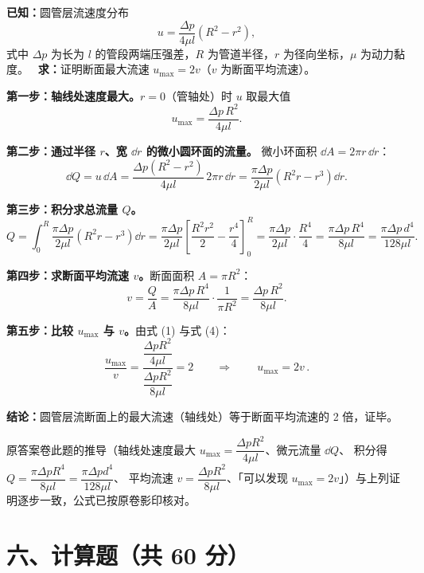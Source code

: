 
\begin{jie}
\textbf{已知：}圆管层流速度分布
\[
u=\frac{\Delta p}{4\mu l}\left(R^{2}-r^{2}\right),
\]
式中 $\Delta p$ 为长为 $l$ 的管段两端压强差，$R$ 为管道半径，$r$ 为径向坐标，$\mu$ 为动力黏度。
\ \textbf{求：}证明断面最大流速 $u_{\max}=2v$（$v$ 为断面平均流速）。

\textbf{第一步：轴线处速度最大。}$r=0$（管轴处）时 $u$ 取最大值
\[
u_{\max}=\frac{\Delta p\,R^{2}}{4\mu l}. \tag{1}
\]

\textbf{第二步：通过半径 $r$、宽 $\dd r$ 的微小圆环面的流量。}
微小环面积 $\dd A=2\pi r\,\dd r$：
\[
\dd Q=u\,\dd A=\frac{\Delta p\left(R^{2}-r^{2}\right)}{4\mu l}\,2\pi r\,\dd r
=\frac{\pi\Delta p}{2\mu l}\left(R^{2}r-r^{3}\right)\dd r . \tag{2}
\]

\textbf{第三步：积分求总流量 $Q$。}
\[
Q=\int_0^{R}\frac{\pi\Delta p}{2\mu l}\left(R^{2}r-r^{3}\right)\dd r
=\frac{\pi\Delta p}{2\mu l}\left[\frac{R^{2}r^{2}}{2}-\frac{r^{4}}{4}\right]_0^{R}
=\frac{\pi\Delta p}{2\mu l}\cdot\frac{R^{4}}{4}
=\frac{\pi\Delta p\,R^{4}}{8\mu l}
=\frac{\pi\Delta p\,d^{4}}{128\mu l}. \tag{3}
\]

\textbf{第四步：求断面平均流速 $v$。}断面面积 $A=\pi R^{2}$：
\[
v=\frac{Q}{A}=\frac{\pi\Delta p\,R^{4}}{8\mu l}\cdot\frac{1}{\pi R^{2}}
=\frac{\Delta p\,R^{2}}{8\mu l}. \tag{4}
\]

\textbf{第五步：比较 $u_{\max}$ 与 $v$。}由式 (1) 与式 (4)：
\[
\frac{u_{\max}}{v}=\frac{\dfrac{\Delta pR^{2}}{4\mu l}}{\dfrac{\Delta pR^{2}}{8\mu l}}=2
\qquad\Longrightarrow\qquad
\boxed{\,u_{\max}=2v\,}.
\]

\textbf{结论：}圆管层流断面上的最大流速（轴线处）等于断面平均流速的 2 倍，证毕。
\end{jie}

\begin{tishi}
原答案卷此题的推导（轴线处速度最大 $u_{\max}=\dfrac{\Delta pR^{2}}{4\mu l}$、微元流量 $\dd Q$、
积分得 $Q=\dfrac{\pi\Delta pR^{4}}{8\mu l}=\dfrac{\pi\Delta pd^{4}}{128\mu l}$、
平均流速 $v=\dfrac{\Delta pR^{2}}{8\mu l}$、「可以发现 $u_{\max}=2v$」）与上列证明逐步一致，公式已按原卷影印核对。
\end{tishi}

\section{六、计算题（共 60 分）}



